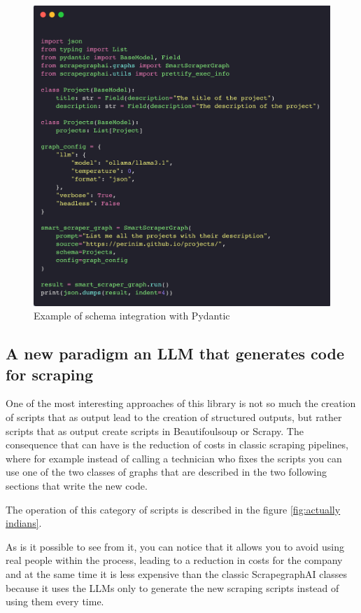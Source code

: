\begin{figure}[H]
    \centering
    \includegraphics[width=1\linewidth]{Assets/schema_integration.png}
    \caption{Example of schema integration with Pydantic}
    \label{fig:enter-label}
\end{figure}


\subsection{A new paradigm an LLM that generates code for scraping}
One of the most interesting approaches of this library is not so much the creation of scripts that as output lead to the creation of structured outputs, but rather scripts that as output create scripts in Beautifoulsoup or Scrapy.
The consequence that can have is the reduction of costs in classic scraping pipelines, where for example instead of calling a technician who fixes the scripts you can use one of the two classes of graphs that are described in the two following sections that write the new code.

The operation of this category of scripts is described in the figure \ref{fig:actually indians}.

As is it possible to see from it, you can notice that it allows you to avoid using real people within the process, leading to a reduction in costs for the company and at the same time it is less expensive than the classic ScrapegraphAI  classes because it uses the LLMs only to generate the new scraping scripts instead of using them every time.

